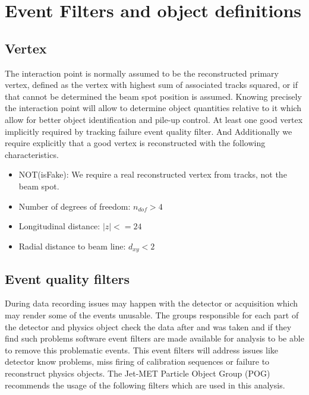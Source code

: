 \section{Event Filters and object definitions}

\subsection{Vertex}

The interaction point is normally assumed to be the reconstructed  primary vertex, defined as the vertex with highest sum of associated tracks \pt squared, or if that cannot be determined the beam spot position is assumed. Knowing precisely the interaction point will allow to determine object quantities relative to it which allow for better object identification and pile-up control. At least one good vertex implicitly required by tracking failure event quality filter. And Additionally we require explicitly that a good vertex is reconstructed with the following characteristics. 

\begin{itemize}
  \item NOT(isFake): We require a real reconstructed vertex from tracks, not the beam spot.
  \item Number of degrees of freedom: $n_{dof}>4$
  \item Longitudinal distance: $|z|<=24$
  \item Radial distance to beam line: $d_{xy}<2$
\end{itemize}

\subsection{Event quality filters}

During data recording issues may happen with the detector or acquisition which may render some of the events unusable. The groups responsible for each part of the detector and physics object check the data after and was taken and if they find such problems software event filters are made available for analysis to be able to remove this problematic events. This event filters will address issues like detector know problems, miss firing of calibration sequences or failure to reconstruct physics objects. The Jet-MET Particle Object Group (POG) recommends the usage of the following filters which are used in this analysis\cite{CMS:JetMETPOG:MissingETOptionalFilters}.

